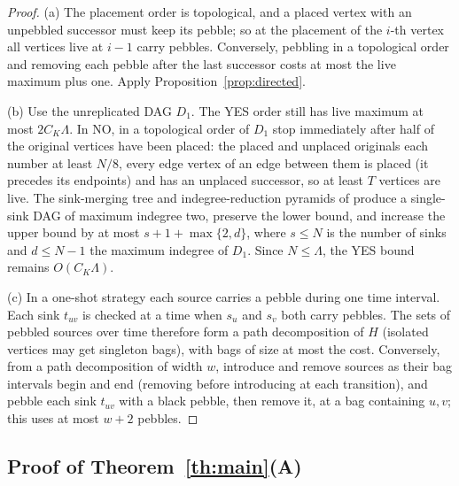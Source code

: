 \documentclass[11pt,letterpaper]{article}
\theoremstyle{definition}
\theoremstyle{remark}
\begin{document}
\begin{proof}
(a) The placement order is topological, and a placed vertex with an
unpebbled successor must keep its pebble; so at the placement of the
\(i\)-th vertex all vertices live at \(i-1\) carry pebbles. Conversely,
pebbling in a topological order and removing each pebble after the last
successor costs at most the live maximum plus one. Apply
Proposition~\ref{prop:directed}.

(b) Use the unreplicated DAG \(D_1\). The YES order still has live maximum
at most \(2C_K\Lambda\). In NO, in a topological order of \(D_1\) stop
immediately after half of the original vertices have been placed: the
placed and unplaced originals each number at least \(N/8\), every edge vertex
of an edge between them is placed (it precedes its endpoints) and has an
unplaced successor, so at least \(T\) vertices are live. The sink-merging
tree and indegree-reduction pyramids of \cite[Lemmas~7.1--7.2]{wapl14}
produce a single-sink DAG of maximum indegree two, preserve the lower bound,
and increase the upper bound by at most \(s+1+\max\{2,d\}\), where \(s\le N\)
is the number of sinks and \(d\le N-1\) the maximum indegree of \(D_1\).
Since \(N\le\Lambda\), the YES bound remains \(O(C_K\Lambda)\).

(c) In a one-shot strategy each source carries a pebble during one time
interval. Each sink \(t_{uv}\) is checked at a time when \(s_u\) and \(s_v\)
both carry pebbles. The sets of pebbled sources over time therefore form a
path decomposition of \(H\) (isolated vertices may get singleton bags), with
bags of size at most the cost. Conversely, from a path decomposition of width
\(w\), introduce and remove sources as their bag intervals begin and end
(removing before introducing at each transition), and pebble each sink
\(t_{uv}\) with a black pebble, then remove it, at a bag containing \(u,v\);
this uses at most \(w+2\) pebbles.
\end{proof}

\subsection{Proof of Theorem~\ref{th:main}(A)}
\end{document}
